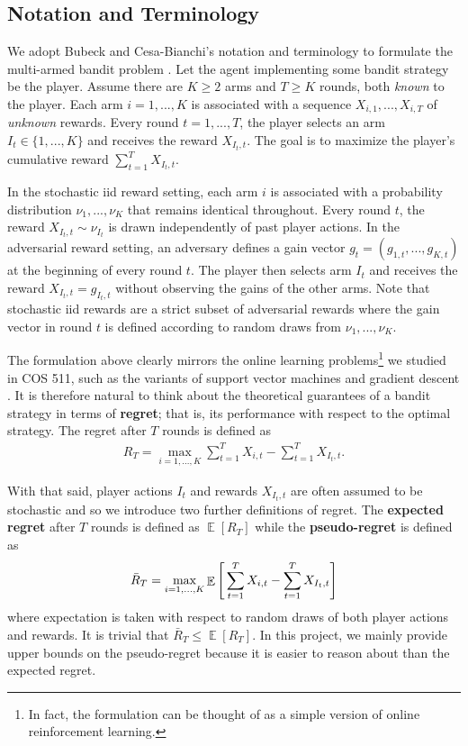 \documentclass[12pt]{article}
\DeclareMathOperator*{\E}{\mathbb{E}}
\begin{document}
\subsection{Notation and Terminology}

We adopt Bubeck and Cesa-Bianchi's notation and terminology to formulate the multi-armed bandit problem \cite{bubeck2012}. Let the agent implementing some bandit strategy be the player. Assume there are $K\geq 2$ arms and $T\geq K$ rounds, both \textit{known} to the player. Each arm $i=1,...,K$ is associated with a sequence $X_{i,1},...,X_{i,T}$ of \textit{unknown} rewards. Every round $t=1,...,T$, the player selects an arm $I_{t}\in\{1,...,K\}$ and receives the reward $X_{I_{t},t}$. The goal is to maximize the player's cumulative reward $\sum_{t=1}^{T}X_{I_{t},t}$.

In the stochastic iid reward setting, each arm $i$ is associated with a probability distribution $\nu_{1},...,\nu_{K}$ that remains identical throughout. Every round $t$, the reward $X_{I_{t},t}\sim\nu_{I_{t}}$ is drawn independently of past player actions. In the adversarial reward setting, an adversary defines a gain vector $g_{t}=(g_{1,t},...,g_{K,t})$ at the beginning of every round $t$. The player then selects arm $I_{t}$ and receives the reward $X_{I_{t},t}=g_{I_{t},t}$ without observing the gains of the other arms. Note that stochastic iid rewards are a strict subset of adversarial rewards where the gain vector in round $t$ is defined according to random draws from $\nu_{1},...,\nu_{K}$.

The formulation above clearly mirrors the online learning problems\footnote{In fact, the formulation can be thought of as a simple version of online reinforcement learning.} we studied in COS 511, such as the variants of support vector machines \cite{lecture16} and gradient descent \cite{lecture18}. It is therefore natural to think about the theoretical guarantees of a bandit strategy in terms of \textbf{regret}; that is, its performance with respect to the optimal strategy. The regret after $T$ rounds is defined as
\begin{align}
R_{T}=\max_{i=1,...,K}\sum_{t=1}^{T}X_{i,t}-\sum_{t=1}^{T}X_{I_{t},t}.
\end{align}

With that said, player actions $I_{t}$ and rewards $X_{I_{t},t}$ are often assumed to be stochastic and so we introduce two further definitions of regret. The \textbf{expected regret} after $T$ rounds is defined as $\E[R_T]$ while the \textbf{pseudo-regret} is defined as 
\begin{gather}
\bar{R}_{T}=\max_{i=1,...,K}\E\Bigg{[}\sum_{t=1}^{T}X_{i,t}-\sum_{t=1}^{T}X_{I_{t},t}\Bigg{]}
\end{gather}
where expectation is taken with respect to random draws of both player actions and rewards. It is trivial that $\bar{R}_{T}\leq\E[R_{T}]$. In this project, we mainly provide upper bounds on the pseudo-regret because it is easier to reason about than the expected regret.
\end{document}
